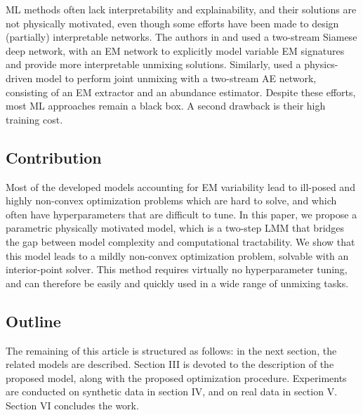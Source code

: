 ML methods often lack interpretability and explainability, and their solutions are not physically motivated, even though some efforts have been made to design (partially) interpretable networks. The authors in \cite{hong_endmember-guided_2022} and \cite{lyngdoh_hyperspectral_2022} used a two-stream Siamese deep network, with an EM network to explicitly model variable EM signatures and provide more interpretable unmixing solutions. Similarly, \cite{zheng_blind_2024} used a physics-driven model to perform joint unmixing with a two-stream AE network, consisting of an EM extractor and an abundance estimator. Despite these efforts, most ML approaches remain a black box. A second drawback is their high training cost.

\subsection{Contribution}

Most of the developed models accounting for EM variability lead to ill-posed and highly non-convex optimization problems which are hard to solve, and which often have hyperparameters that are difficult to tune. In this paper, we propose a parametric physically motivated model, which is a two-step LMM that bridges the gap between model complexity and computational tractability. We show that this model leads to a mildly non-convex optimization problem, solvable with an interior-point solver. This method requires virtually no hyperparameter tuning, and can therefore be easily and quickly used in a wide range of unmixing tasks. 

\subsection{Outline}
The remaining of this article is structured as follows: in the next section, the related models are described. Section III is devoted to the description of the proposed model, along with the proposed  optimization procedure. Experiments are conducted on synthetic data in section IV, and  on real data in section V. Section VI concludes the work.